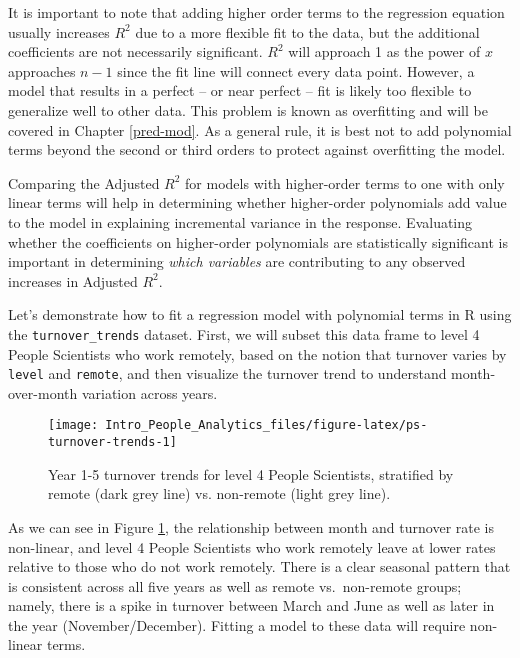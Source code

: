 \documentclass[
]{book}
\begin{document}
It is important to note that adding higher order terms to the regression equation usually increases \(R^2\) due to a more flexible fit to the data, but the additional coefficients are not necessarily significant. \(R^2\) will approach 1 as the power of \(x\) approaches \(n-1\) since the fit line will connect every data point. However, a model that results in a perfect -- or near perfect -- fit is likely too flexible to generalize well to other data. This problem is known as overfitting and will be covered in Chapter \ref{pred-mod}. As a general rule, it is best not to add polynomial terms beyond the second or third orders to protect against overfitting the model.

Comparing the Adjusted \(R^2\) for models with higher-order terms to one with only linear terms will help in determining whether higher-order polynomials add value to the model in explaining incremental variance in the response. Evaluating whether the coefficients on higher-order polynomials are statistically significant is important in determining \emph{which variables} are contributing to any observed increases in Adjusted \(R^2\).

Let's demonstrate how to fit a regression model with polynomial terms in R using the \texttt{turnover\_trends} dataset. First, we will subset this data frame to level 4 People Scientists who work remotely, based on the notion that turnover varies by \texttt{level} and \texttt{remote}, and then visualize the turnover trend to understand month-over-month variation across years.

\begin{figure}

{\centering \texttt{[image: Intro\_People\_Analytics\_files/figure-latex/ps-turnover-trends-1]} 

}

\caption{Year 1-5 turnover trends for level 4 People Scientists, stratified by remote (dark grey line) vs. non-remote (light grey line).}\label{fig:ps-turnover-trends}
\end{figure}

As we can see in Figure \ref{fig:ps-turnover-trends}, the relationship between month and turnover rate is non-linear, and level 4 People Scientists who work remotely leave at lower rates relative to those who do not work remotely. There is a clear seasonal pattern that is consistent across all five years as well as remote vs.~non-remote groups; namely, there is a spike in turnover between March and June as well as later in the year (November/December). Fitting a model to these data will require non-linear terms.
\end{document}
